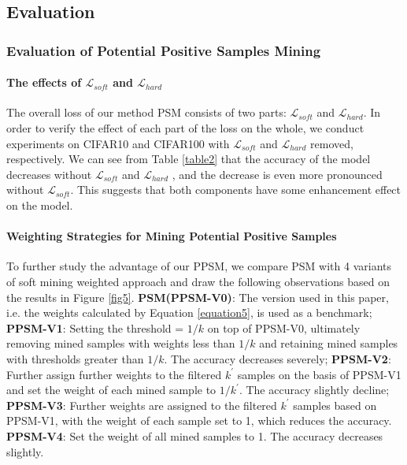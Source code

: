 \documentclass[review]{elsarticle}
\begin{document}
\subsection{Evaluation}
\subsubsection{Evaluation of Potential Positive Samples Mining}
\paragraph{The effects of $\mathcal{L} _{soft}$ and $\mathcal{L} _{hard}$}
The overall loss of our method PSM consists of two parts: $\mathcal{L} _{soft}$ and  $\mathcal{L} _{hard}$. In order to verify the effect of each part of the loss on the whole, we conduct experiments on CIFAR10 and CIFAR100 with $\mathcal{L} _{soft}$ and  $\mathcal{L} _{hard}$ removed, respectively. We can see from Table \ref{table2} that the accuracy of the model decreases without $\mathcal{L} _{soft}$ and  $\mathcal{L} _{hard}$ , and the decrease is even more pronounced without  $\mathcal{L} _{soft}$. This suggests that both components have some enhancement effect on the model.



\paragraph{Weighting Strategies for Mining Potential Positive Samples}
To further study the advantage of our PPSM, we compare PSM with 4 variants of soft mining weighted approach and draw the following observations based on the results in Figure \ref{fig5}. \textbf{PSM(PPSM-V0)}: The version used in this paper, i.e. the weights 
calculated by Equation \ref{equation5}, is used as a benchmark; 
\textbf{PPSM-V1}: Setting the threshold = $1/k $ on top of PPSM-V0, ultimately removing mined samples with weights less than $ 1/k$ and retaining mined samples with thresholds greater than $1/k$. The accuracy decreases severely;
\textbf{PPSM-V2}: Further assign further weights to the filtered $k^{'}$ samples on the basis of PPSM-V1 and set the weight of each mined sample to $1/k^{'}$. The accuracy slightly decline;
\textbf{PPSM-V3}: Further weights are assigned to the filtered $k^{'}$ samples based on  PPSM-V1, with the weight of each sample set to 1, which reduces the accuracy.
\textbf{PPSM-V4}: Set the weight of all mined samples to 1. The accuracy decreases slightly.
\end{document}
